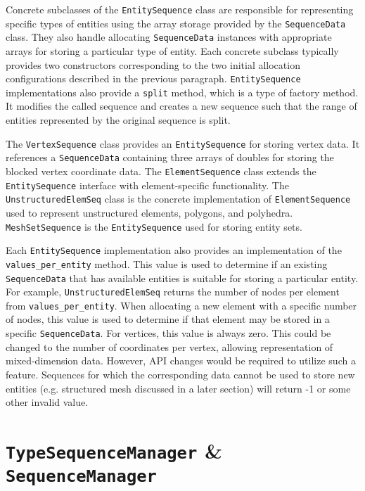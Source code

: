 \documentclass{report}
\begin{document}
Concrete subclasses of the \texttt{EntitySequence} class are responsible for representing specific types of entities using the array storage provided by the \texttt{SequenceData} class.  They also handle allocating \texttt{SequenceData} instances with appropriate arrays for storing a particular type of entity.  Each concrete subclass typically provides two constructors corresponding to the two initial allocation configurations described in the previous paragraph.  \texttt{EntitySequence} implementations also provide a \texttt{split} method, which is a type of factory method.  It modifies the called sequence and creates a new sequence such that the range of entities represented by the original sequence is split.  

The \texttt{VertexSequence} class provides an \texttt{EntitySequence} for storing vertex data.  It references a \texttt{SequenceData} containing three arrays of doubles for storing the blocked vertex coordinate data.  The \texttt{ElementSequence} class extends the \texttt{EntitySequence} interface with element-specific functionality.  The \texttt{UnstructuredElemSeq} class is the concrete implementation of \texttt{ElementSequence} used to represent unstructured elements, polygons, and polyhedra.  \texttt{MeshSetSequence} is the \texttt{EntitySequence} used for storing entity sets.

Each \texttt{EntitySequence} implementation also provides an implementation of the \texttt{values\_per\_entity} method.  This value is used to determine if an existing \texttt{SequenceData} that has available entities is suitable for storing a particular entity.  For example, \texttt{UnstructuredElemSeq} returns the number of nodes per element from \texttt{values\_per\_entity}.  When allocating a new element with a specific number of nodes, this value is used to determine if that element may be stored in a specific \texttt{SequenceData}.  For vertices, this value is always zero.  This could be changed to the number of coordinates per vertex, allowing representation of mixed-dimension data. However, API changes would be required to utilize such a feature.  Sequences for which the corresponding data cannot be used to store new entities (e.g. structured mesh discussed in a later section) will return -1 or some other invalid value.


\section{\texttt{TypeSequenceManager} \& \texttt{SequenceManager}}
\end{document}
